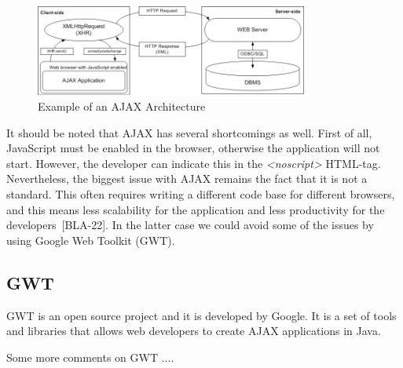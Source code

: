 \begin{figure}[h]
	\begin{center}
		\includegraphics[width=0.8\textwidth]{./img/ajax01a.png}
		\caption{Example of an AJAX Architecture}
		\label{fig:ajax01}
	\end{center}
\end{figure}


It should be noted that AJAX has several shortcomings as well. First of all, 
JavaScript must be enabled in the browser, otherwise the application will not start.
However, the developer can indicate this in the \emph{<noscript>} HTML-tag. 
Nevertheless, the biggest issue with AJAX remains the fact that it is not a
standard. This often requires writing a different code base for different
browsers, and this means less scalability for the application and less productivity for
the developers~[BLA-22]. In the latter case we could avoid some of the issues by using 
Google Web Toolkit (GWT).

\subsection{GWT}

GWT is an open source project
and it is developed by Google. It is a set of tools and libraries that allows web developers to
create AJAX applications in Java. 

Some more comments on GWT ....

